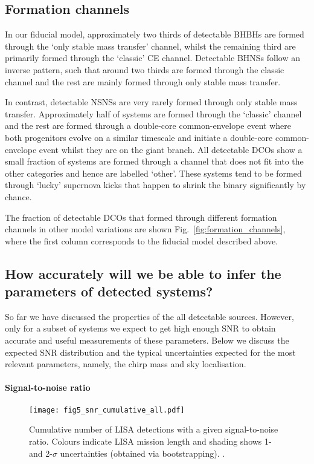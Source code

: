 \subsection{Formation channels}\label{sec:progenitors_and_formation}
In our fiducial model, approximately two thirds of detectable BHBHs are formed through the `only stable mass transfer' channel, whilst the remaining third are primarily formed through the `classic' CE channel. Detectable BHNSs follow an inverse pattern, such that around two thirds are formed through the classic channel and the rest are mainly formed through only stable mass transfer.

In contrast, detectable NSNSs are very rarely formed through only stable mass transfer. Approximately half of systems are formed through the `classic' channel and the rest are formed through a double-core common-envelope event \citep{Brown+1995} where both progenitors evolve on a similar timescale and initiate a double-core common-envelope event whilst they are on the giant branch. All detectable DCOs show a small fraction of systems are formed through a channel that does not fit into the other categories and hence are labelled `other'. These systems tend to be formed through `lucky' supernova kicks that happen to shrink the binary significantly by chance.

The fraction of detectable DCOs that formed through different formation channels in other model variations are shown Fig.~\ref{fig:formation_channels}, where the first column corresponds to the fiducial model described above.

\subsection{How accurately will we be able to infer the parameters of detected systems?}\label{sec:measurement_uncertainties}
So far we have discussed the properties of the all detectable sources. However, only for a subset of systems we expect to get high enough SNR to obtain accurate and useful measurements of these parameters. Below we discuss the expected SNR distribution and the typical uncertainties expected for the most relevant parameters, namely, the chirp mass and sky localisation.

\paragraph{Signal-to-noise ratio}

\begin{figure}[tb]
    \centering
    \texttt{[image: fig5\_snr\_cumulative\_all.pdf]}
    \caption{Cumulative number of LISA detections with a given signal-to-noise ratio. Colours indicate LISA mission length and shading shows 1- and 2-$\sigma$ uncertainties (obtained via bootstrapping). \href{https://github.com/TomWagg/detecting-DCOs-in-LISA/blob/main/paper/figures/fig5_snr_cumulative_all.pdf}{\faFileImage} \href{https://github.com/TomWagg/detecting-DCOs-in-LISA/blob/main/paper/figure_notebooks/fiducial.ipynb}{\faBook}.}
    \label{fig:snr_dist}
\end{figure}

